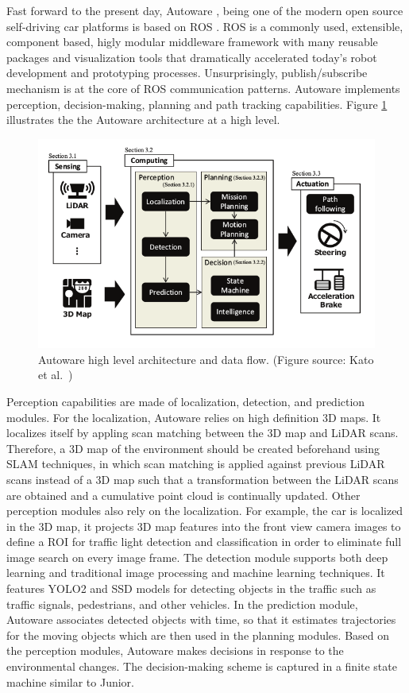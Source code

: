 Fast forward to the present day, Autoware \cite{Kato2018AutowareOB}, being one
of the modern open source self-driving car platforms is based on ROS
\cite{Quigley2009ROSAO}. ROS is a commonly used, extensible, component based,
higly modular middleware framework with many reusable packages and
visualization tools that dramatically accelerated today's robot development and
prototyping processes. Unsurprisingly, publish/subscribe mechanism is at the
core of ROS communication patterns. Autoware implements perception,
decision-making, planning and path tracking capabilities. Figure
\ref{figure:autoware} illustrates the the Autoware architecture at a high
level.

\begin{figure}[h]
  \centering
  \includegraphics[width=.8\textwidth]{figures/autoware.png}
  \caption[Autoware high level architecture]{Autoware high level architecture
    and data flow. (Figure source: Kato et al.\ \cite{Kato2018AutowareOB})}
  \label{figure:autoware}
\end{figure}

Perception capabilities are made of localization, detection, and prediction
modules. For the localization, Autoware relies on high definition 3D maps. It
localizes itself by appling scan matching between the 3D map and LiDAR scans.
Therefore, a 3D map of the environment should be created beforehand using SLAM
techniques, in which scan matching is applied against previous LiDAR scans
instead of a 3D map such that a transformation between the LiDAR scans are
obtained and a cumulative point cloud is continually updated. Other perception
modules also rely on the localization. For example, the car is localized in
the 3D map, it projects 3D map features into the front view camera images to
define a ROI for traffic light detection and classification in order to
eliminate full image search on every image frame. The detection module supports
both deep learning and traditional image processing and machine learning
techniques. It features YOLO2 \cite{Redmon2016YOLO9000BF} and SSD
\cite{Liu2016SSDSS} models for detecting objects in the traffic such as traffic
signals, pedestrians, and other vehicles. In the prediction module, Autoware
associates detected objects with time, so that it estimates trajectories for
the moving objects which are then used in the planning modules. Based on the
perception modules, Autoware makes decisions in response to the environmental
changes. The decision-making scheme is captured in a finite state machine
similar to Junior.

